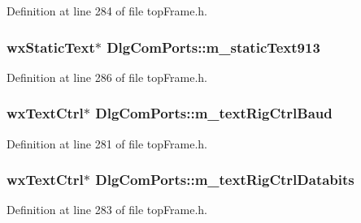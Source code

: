 Definition at line 284 of file top\-Frame.\-h.

\hypertarget{class_dlg_com_ports_a4feeee0f9422f971e0ae0abd6a6ef68c}{
\subsubsection[{m\-\_\-static\-Text913}]{\setlength{\rightskip}{0pt plus 5cm}wx\-Static\-Text$\ast$ Dlg\-Com\-Ports\-::m\-\_\-static\-Text913\hspace{0.3cm}{\ttfamily [protected]}}}\label{class_dlg_com_ports_a4feeee0f9422f971e0ae0abd6a6ef68c}


Definition at line 286 of file top\-Frame.\-h.

\hypertarget{class_dlg_com_ports_a3ce4c208d87405f7c4242819339039d8}{
\subsubsection[{m\-\_\-text\-Rig\-Ctrl\-Baud}]{\setlength{\rightskip}{0pt plus 5cm}wx\-Text\-Ctrl$\ast$ Dlg\-Com\-Ports\-::m\-\_\-text\-Rig\-Ctrl\-Baud\hspace{0.3cm}{\ttfamily [protected]}}}\label{class_dlg_com_ports_a3ce4c208d87405f7c4242819339039d8}


Definition at line 281 of file top\-Frame.\-h.

\hypertarget{class_dlg_com_ports_a480454f649f9bc72afbf42c5e9521e3b}{
\subsubsection[{m\-\_\-text\-Rig\-Ctrl\-Databits}]{\setlength{\rightskip}{0pt plus 5cm}wx\-Text\-Ctrl$\ast$ Dlg\-Com\-Ports\-::m\-\_\-text\-Rig\-Ctrl\-Databits\hspace{0.3cm}{\ttfamily [protected]}}}\label{class_dlg_com_ports_a480454f649f9bc72afbf42c5e9521e3b}


Definition at line 283 of file top\-Frame.\-h.


